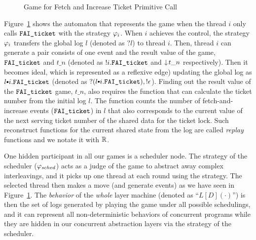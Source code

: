 \begin{figure}

\begin{center}
\end{center}%
\caption{Game for Fetch and Increase Ticket Primitive Call}
\label{fig:chapter:ccal:game-for-fetch-and-increase-ticket-primitive-call}
\end{figure}
Figure~\ref{fig:chapter:ccal:game-for-fetch-and-increase-ticket-primitive-call} shows the  automaton that represents the
game when the thread $i$ only calls ${\mathrm{\texttt{FAI\_ticket}}}$ with the strategy $\varphi_{i}$.
When $i$ achieves the control, the strategy  $\varphi_{i}$ transfers the global log $l$  (denoted as $?l$) to thread $i$. 
Then, thread $i$ can generate a pair consists of one event and the result value of the game, 
${\mathrm{\texttt{FAI\_ticket}}}$ and $t\_n$ (denoted as $!i.{\mathrm{\texttt{FAI\_ticket}}}$ and $\downarrow\! t\_n$ respectively). 
Then it becomes ideal, which is represented as a reflexive edge) updating the global log as $l \cons i.\incticket$ (denoted as $?(l \cons i.\incticket),!\epsilon$).
Finding out the result value of the ${\mathrm{\texttt{FAI\_ticket}}}$ game, $t\_n$, 
also requires the function that can calculate the ticket number from the initial log $l$.
The function counts the number of fetch-and-increase events (${\mathrm{\texttt{FAI\_ticket}}}$) in $l$ that
also corresponds to the current value of the next serving ticket number of the shared data for the ticket lock.
Such reconstruct functions for the current shared state from the log are called \emph{replay} functions and we notate it with $\mathbb{R}$.

One hidden participant in all our games is a scheduler node. 
The strategy of the scheduler ($\varphi_{sched}$) acts as a judge of the game to abstract away complex interleavings, 
and it picks up one thread at each round using the strategy. 
The selected thread then makes a move  (and generate events)  as we have seen in Figure~\ref{fig:chapter:ccal:game-for-fetch-and-increase-ticket-primitive-call}.
The \emph{behavior} of the \emph{whole} layer machine (denoted as ``$L[D](\cdot)$'') 
is then the set of  logs generated by playing the game under all possible schedulings, and it can represent all non-deterministic behaviors of concurrent programs 
while they are hidden in our concurrent abstraction layers via the strategy of the scheduler.


